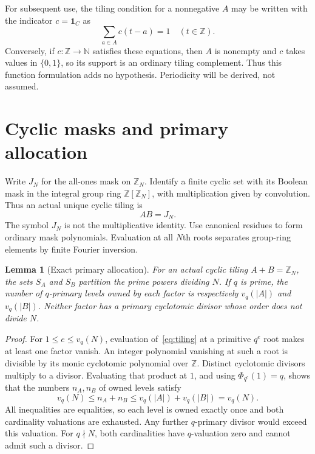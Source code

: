 \documentclass[11pt]{article}
\newtheorem{lemma}[theorem]{Lemma}
\newcommand{\Z}{\mathbb Z}
\newcommand{\PhiC}{\Phi}
\begin{document}
For subsequent use, the tiling condition for a nonnegative $A$ may be written with the indicator $c=\mathbf{1}_C$ as
\begin{equation}\label{eq:integer}
 \sum_{a\in A}c(t-a)=1\quad(t\in\Z).
\end{equation}
Conversely, if $c:\Z\to\mathbb N$ satisfies these equations, then $A$ is nonempty and $c$ takes values in $\{0,1\}$, so its support is an ordinary tiling complement. Thus this function formulation adds no hypothesis. Periodicity will be derived, not assumed.

\section{Cyclic masks and primary allocation}
Write $J_N$ for the all-ones mask on $\Z_N$. Identify a finite cyclic set with its Boolean mask in the integral group ring $\Z[\Z_N]$, with multiplication given by convolution. Thus an actual unique cyclic tiling is
\begin{equation}\label{eq:tiling}
 AB=J_N.
\end{equation}
The symbol $J_N$ is not the multiplicative identity. Use canonical residues to form ordinary mask polynomials. Evaluation at all $N$th roots separates group-ring elements by finite Fourier inversion.

\begin{lemma}[Exact primary allocation]\label{lem:allocation}
For an actual cyclic tiling $A+B=\Z_N$, the sets $S_A$ and $S_B$ partition the prime powers dividing $N$. If $q$ is prime, the number of $q$-primary levels owned by each factor is respectively $v_q(|A|)$ and $v_q(|B|)$. Neither factor has a primary cyclotomic divisor whose order does not divide $N$.
\end{lemma}
\begin{proof}
For $1\le e\le v_q(N)$, evaluation of~\eqref{eq:tiling} at a primitive $q^e$ root makes at least one factor vanish. An integer polynomial vanishing at such a root is divisible by its monic cyclotomic polynomial over $\Z$. Distinct cyclotomic divisors multiply to a divisor. Evaluating that product at $1$, and using $\PhiC_{q^e}(1)=q$, shows that the numbers $n_A,n_B$ of owned levels satisfy
\[
 v_q(N)\le n_A+n_B\le v_q(|A|)+v_q(|B|)=v_q(N).
\]
All inequalities are equalities, so each level is owned exactly once and both cardinality valuations are exhausted. Any further $q$-primary divisor would exceed this valuation. For $q\nmid N$, both cardinalities have $q$-valuation zero and cannot admit such a divisor.
\end{proof}
\end{document}
